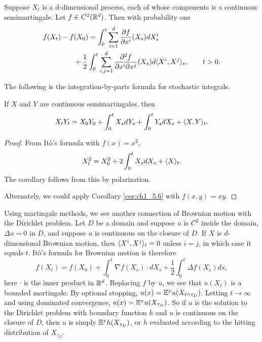 \begin{corollary}\label{cor:ch1_5.6}
Suppose $X_t$ is a d-dimensional process, each of whose components is a continuous semimartingale. Let $f \in C^2(\mathbb{R}^d)$. Then with probability one
\begin{align*}
    f(X_t) - f&(X_0) = \int_0^t \sum_{i=1}^d \frac{\partial f}{\partial x^i}(X_s)dX_s^i \\
    &+ \frac{1}{2}\int_0^t \sum_{i,j=1}^d \frac{\partial^2 f}{\partial x^i\partial x^j}(X_s)d\langle X^i,X^j \rangle_s, \qquad t > 0.
\end{align*}
\end{corollary}


The following is the integration-by-parts formula for stochastic integrals.

\begin{corollary}\label{cor:ch1_5.7}
If $X$ and $Y$ are continuous semimartingales, then
\[
    X_tY_t = X_0Y_0 + \int_0^t X_s dY_s + \int_0^t Y_s dX_s + \langle X,Y \rangle_t.
\]
\end{corollary}

\begin{proof}
From It\^o's formula with $f(x) = x^2$,
\mpagebreak
\begin{equation}\label{eq:ch1_5.6}
    X_t^2 = X_0^2 + 2\int_0^t X_s dX_s + \langle X \rangle_t.
\end{equation}
The corollary follows from this by polarization.

Alternately, we could apply Corollary \ref{cor:ch1_5.6} with $f(x,y) = xy$.
\end{proof}


Using martingale methods, we see another connection of Brownian motion with the Dirichlet problem. Let $D$ be a domain and suppose $u$ is $C^2$ inside the domain, $\Delta u = 0$ in $D$, and suppose $u$ is continuous on the closure of $D$. If $X$ is $d$-dimensional Brownian motion, then $\langle X^i,X^j \rangle_t = 0$ unless $i = j$, in which case it equals $t$. It\^o's formula for Brownian motion is therefore
\begin{equation}\label{eq:ch1_5.7}
    f(X_t) = f(X_0) + \int_0^t \nabla f(X_s) \cdot dX_s + \frac{1}{2}\int_0^t \Delta f(X_s)ds,
\end{equation}
here $\cdot$ is the inner product in $\mathbb{R}^d$. Replacing $f$ by $u$, we see that $u(X_t)$ is a bounded martingale. By optional stopping, $u(x) = \mathbb{E}^x u(X_{t\wedge \tau_D})$. Letting $t \to \infty$ and using dominated convergence, $u(x) = \mathbb{E}^x u(X_{\tau_D})$. So if $u$ is the solution to the Dirichlet problem with boundary function $h$ and $u$ is continuous on the closure of $D$, then $u$ is simply $\mathbb{E}^x h(X_{\tau_D})$, or $h$ evaluated according to the hitting distribution of $X_{\tau_D}$.

